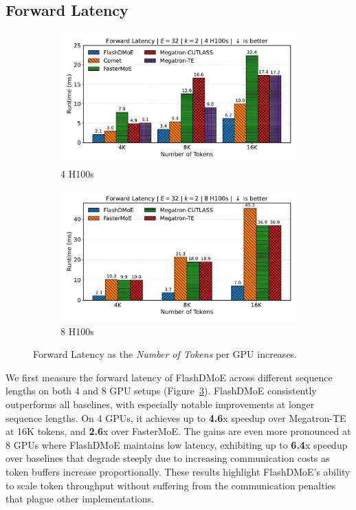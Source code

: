 \subsection{Forward Latency}\label{subsec:forward-latency}
\begin{figure}[!h]
    \centering
    \begin{subfigure}{0.49\textwidth}
        \centering
        \includegraphics[width=\linewidth, keepaspectratio]{figures/scaling_tokens}
        \caption{4 H100s}
        \label{sub:4gl}
    \end{subfigure}
    \begin{subfigure}{0.49\textwidth}
        \centering
        \includegraphics[width=\linewidth, keepaspectratio]{figures/scaling_tokens_8}
        \caption{8 H100s}
        \label{sub:8gl}
    \end{subfigure}
    \caption{Forward Latency as the \emph{Number of Tokens} per GPU increases.}
    \label{fig:fl}
\end{figure}
We first measure the forward latency of FlashDMoE across different sequence lengths on both 4 and 8 GPU setups
(Figure~\ref{fig:fl}).
FlashDMoE consistently outperforms all baselines,
with especially notable improvements at longer sequence lengths.
On 4 GPUs, it achieves up to \textbf{4.6}x speedup over Megatron-TE at 16K tokens,
and \textbf{2.6}x over FasterMoE.
The gains are even more pronounced at 8 GPUs
where FlashDMoE maintains low latency, exhibiting up to \textbf{6.4}x speedup over baselines that
degrade steeply due to increasing communication costs as token buffers increase proportionally.
These results highlight FlashDMoE’s ability to scale token throughput without suffering from the communication
penalties that plague other implementations.
